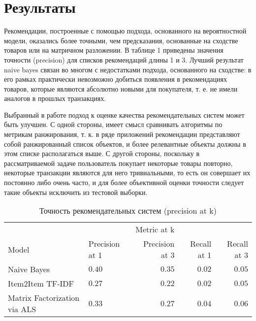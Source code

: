 \documentclass{article}
\begin{document}
\section{Результаты}
Рекомендации, построенные с помощью подхода, основанного на вероятностной модели, оказались более точными, чем предсказания, основанные на сходстве товаров или на матричном разложении. В таблице 1 приведены значения точности (precision) для списков рекомендаций длины 1 и 3. Лучший результат naive bayes связан во многом с недостатками подхода, основанного на сходстве: в его рамках практически невозможно добиться появления в рекомендациях товаров, которые являются абсолютно новыми для покупателя, т. е. не имели аналогов в прошлых транзакциях. \par
Выбранный в работе подход к оценке качества рекомендательных систем может быть улучшен. С одной стороны, имеет смысл сравнивать алгоритмы по метрикам ранжирования, т. к. в ряде приложений рекомендации представляют собой ранжированный список объектов, и более релевантные объекты должны в этом списке располагаться выше. С другой стороны, поскольку в рассматриваемой задаче пользователь покупает некоторые товары повторно, некоторые транзакции являются для него тривиальными, то есть он совершает их постоянно либо очень часто, и для более объективной оценки точности следует такие объекты исключить из тестовой выборки.

\begin{table}
\caption{Точность рекомендательных систем (precision at k)}
\centering
\begin{tabular}{llrrr}
\toprule
\multicolumn{3}{r}{Metric at k} \\
\cmidrule(r){1-4}
Model & Precision at 1 & Precision at 3  & Recall at 1 & Recall at 3 \\
\midrule
Naive Bayes & $0.40$ & $0.35$ & $0.02$ & $0.05$ \\
Item2Item TF-IDF & $0.27$ & $0.22$ & $0.02$ & $0.05$ \\
Matrix Factorization via ALS & $0.33$ & $0.27$ & $0.04$ & $0.06$ \\
\bottomrule
\end{tabular}
\end{table}



\end{document}
